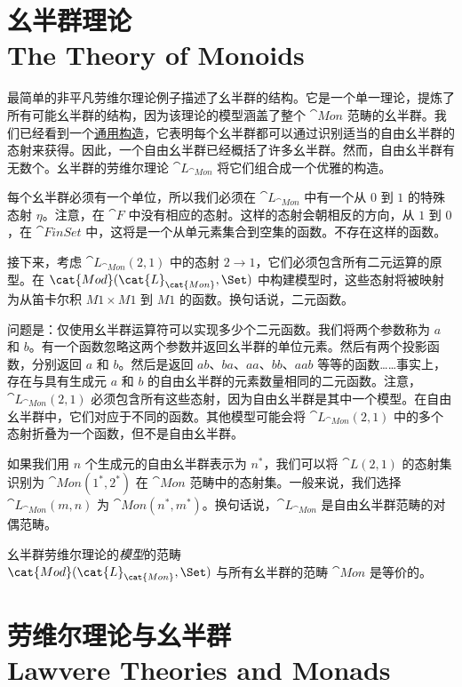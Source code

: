 \section{幺半群理论\\ \textmd{The Theory of Monoids}}

最简单的非平凡劳维尔理论例子描述了幺半群的结构。它是一个单一理论，提炼了所有可能幺半群的结构，因为该理论的模型涵盖了整个 $\cat{Mon}$ 范畴的幺半群。我们已经看到一个\hyperref[free-monoids]{通用构造}，它表明每个幺半群都可以通过识别适当的自由幺半群的态射来获得。因此，一个自由幺半群已经概括了许多幺半群。然而，自由幺半群有无数个。幺半群的劳维尔理论 $\cat{L}_{\cat{Mon}}$ 将它们组合成一个优雅的构造。

每个幺半群必须有一个单位，所以我们必须在 $\cat{L}_{\cat{Mon}}$ 中有一个从 $0$ 到 $1$ 的特殊态射 $\eta$。注意，在 $\cat{F}$ 中没有相应的态射。这样的态射会朝相反的方向，从 $1$ 到 $0$，在 $\cat{FinSet}$ 中，这将是一个从单元素集合到空集的函数。不存在这样的函数。

接下来，考虑 $\cat{L}_{\cat{Mon}}(2, 1)$ 中的态射 $2 \to 1$，它们必须包含所有二元运算的原型。在 $\cat{Mod}(\cat{L}_{\cat{Mon}}, \Set)$ 中构建模型时，这些态射将被映射为从笛卡尔积 $M 1 \times M 1$ 到 $M 1$ 的函数。换句话说，二元函数。

问题是：仅使用幺半群运算符可以实现多少个二元函数。我们将两个参数称为 $a$ 和 $b$。有一个函数忽略这两个参数并返回幺半群的单位元素。然后有两个投影函数，分别返回 $a$ 和 $b$。然后是返回 $ab$、$ba$、$aa$、$bb$、$aab$ 等等的函数……事实上，存在与具有生成元 $a$ 和 $b$ 的自由幺半群的元素数量相同的二元函数。注意，$\cat{L}_{\cat{Mon}}(2, 1)$ 必须包含所有这些态射，因为自由幺半群是其中一个模型。在自由幺半群中，它们对应于不同的函数。其他模型可能会将 $\cat{L}_{\cat{Mon}}(2, 1)$ 中的多个态射折叠为一个函数，但不是自由幺半群。

如果我们用 $n$ 个生成元的自由幺半群表示为 $n^*$，我们可以将 $\cat{L}(2, 1)$ 的态射集识别为 $\cat{Mon}(1^*, 2^*)$ 在 $\cat{Mon}$ 范畴中的态射集。一般来说，我们选择 $\cat{L}_{\cat{Mon}}(m, n)$ 为 $\cat{Mon}(n^*, m^*)$。换句话说，$\cat{L}_{\cat{Mon}}$ 是自由幺半群范畴的对偶范畴。

幺半群劳维尔理论的\emph{模型}的范畴\\
$\cat{Mod}(\cat{L}_{\cat{Mon}}, \Set)$ 与所有幺半群的范畴 $\cat{Mon}$ 是等价的。

\section{劳维尔理论与幺半群\\ \textmd{Lawvere Theories and Monads}}

